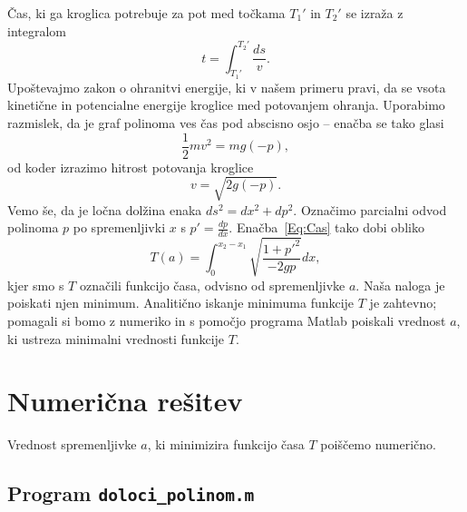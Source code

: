 \documentclass[a4paper]{article}
\begin{document}
Čas, ki ga kroglica potrebuje za pot med točkama $T_{1}'$ in $T_{2}'$ se izraža z integralom 
\begin{equation}
\label{Eq:Cas}
t = \int_{T_{1}'}^{T_{2}'} \frac{ds}{v}.
\end{equation}
%
Upoštevajmo zakon o ohranitvi energije, ki v našem primeru pravi, da se vsota kinetične in potencialne energije kroglice med potovanjem ohranja. Uporabimo razmislek, da je graf polinoma ves čas pod abscisno osjo -- enačba se tako glasi
\begin{equation*}
\frac{1}{2}mv^2 = mg(-p),
\end{equation*}
od koder izrazimo hitrost potovanja kroglice
\begin{equation*}
v = \sqrt{2g(-p)}.
\end{equation*}
%
Vemo še, da je ločna dolžina enaka $ds^2 = dx^2 + dp^2$. Označimo parcialni odvod polinoma $p$ po spremenljivki $x$ s $p'=\frac{dp}{dx}$. Enačba~\eqref{Eq:Cas} tako dobi obliko
\begin{equation}
\label{Eq:CasInt}
T(a) = \int_{0}^{x_2-x_1} \sqrt{ \frac{1+p'^2}{-2gp}} dx,
\end{equation}
kjer smo s $T$ označili funkcijo časa, odvisno od spremenljivke $a$. Naša naloga je poiskati njen minimum.
Analitično iskanje minimuma funkcije $T$ je zahtevno; pomagali si bomo z numeriko in s pomočjo programa Matlab poiskali vrednost $a$, ki ustreza minimalni vrednosti funkcije $T$.

\section{Numerična rešitev}

Vrednost spremenljivke $a$, ki minimizira funkcijo časa $T$ poiščemo numerično. 

\subsection{Program \texttt{doloci\_polinom.m}}
\end{document}
